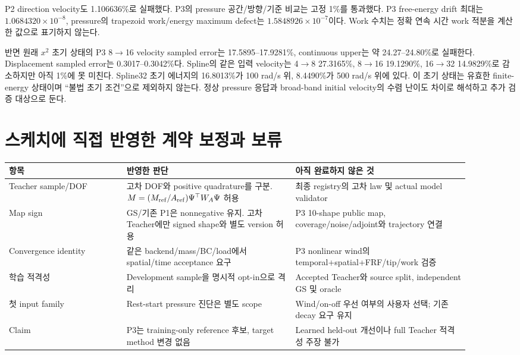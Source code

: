 \documentclass[10pt]{article}
\begin{document}
P2 direction velocity도 1.106636\%로 실패했다. P3의 pressure 공간/방향/기준 비교는 고정 1\%를
통과했다. P3 free-energy drift 최대는 \(1.0684320\times10^{-8}\), pressure의 trapezoid
work/energy maximum defect는 \(1.5848926\times10^{-7}\)이다.
Work 수치는 정확 연속 시간 work 적분을 계산한 값으로 표기하지 않는다.

반면 원래 \(x^2\) 초기 상태의 P3 8$\to$16 velocity sampled error는
17.5895--17.9281\%, continuous upper는 약 24.27--24.80\%로 실패한다.
Displacement sampled error는 0.3017--0.3042\%다.
Spline의 같은 입력 velocity는 4$\to$8 27.3165\%, 8$\to$16 19.1290\%,
16$\to$32 14.9829\%로 감소하지만 아직 1\%에 못 미친다.
Spline32 초기 에너지의 16.8013\%가 100 rad/s 위, 8.4490\%가 500 rad/s 위에 있다.
이 초기 상태는 유효한 finite-energy 상태이며 ``불법 초기 조건''으로 제외하지 않는다.
정상 pressure 응답과 broad-band initial velocity의 수렴 난이도 차이로 해석하고 추가 검증 대상으로 둔다.

\clearpage
\section{스케치에 직접 반영한 계약 보정과 보류}

\begin{longtable}{L{0.23\linewidth}L{0.33\linewidth}L{0.34\linewidth}}
\toprule 항목 & 반영한 판단 & 아직 완료하지 않은 것\\\midrule
Teacher sample/DOF & 고차 DOF와 positive quadrature를 구분. \(M=(M_{\rm ref}/A_{\rm ref})\Psi^\top W_A\Psi\) 허용 & 최종 registry의 고차 law 및 actual model validator\\
Map sign & GS/기존 P1은 nonnegative 유지. 고차 Teacher에만 signed shape와 별도 version 허용 & P3 10-shape public map, coverage/noise/adjoint와 trajectory 연결\\
Convergence identity & 같은 backend/mass/BC/load에서 spatial/time acceptance 요구 & P3 nonlinear wind의 temporal+spatial+FRF/tip/work 검증\\
학습 적격성 & Development sample을 명시적 opt-in으로 격리 & Accepted Teacher와 source split, independent GS 및 oracle\\
첫 input family & Rest-start pressure 진단은 별도 scope & Wind/on-off 우선 여부의 사용자 선택; 기존 decay 요구 유지\\
Claim & P3는 training-only reference 후보, target method 변경 없음 & Learned held-out 개선이나 full Teacher 적격성 주장 불가\\
\bottomrule\end{longtable}
\end{document}
